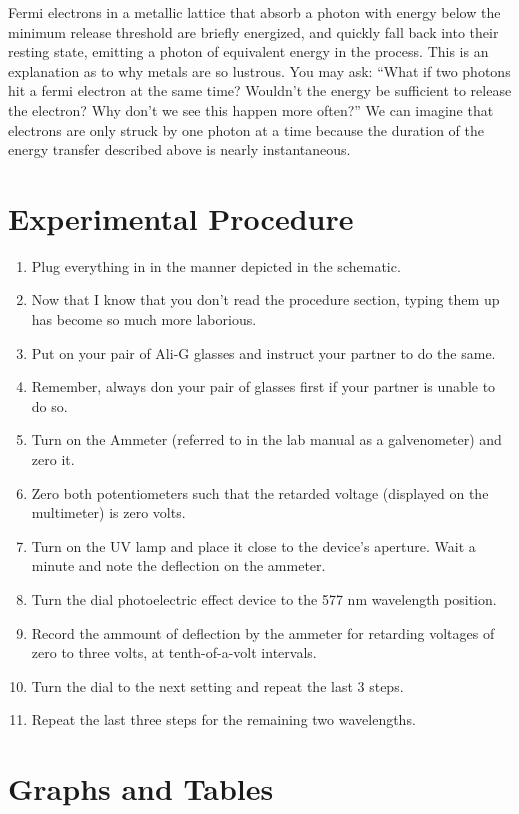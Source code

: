 \documentclass{amsart}
\begin{document}
Fermi electrons in a metallic lattice that absorb a photon with energy below the minimum release threshold are briefly energized, and quickly fall back into their resting state, emitting a photon of equivalent energy in the process. This is an explanation as to why metals are so lustrous. You may ask: “What if two photons hit a fermi electron at the same time? Wouldn’t the energy be sufficient to release the electron? Why don’t we see this happen more often?” We can imagine that electrons are only struck by one photon at a time because the duration of the energy transfer described above is nearly instantaneous.

\section{Experimental Procedure}
\begin{enumerate}
    \item Plug everything in in the manner depicted in the schematic.
    \item Now that I know that you don't read the procedure section, typing them up has become so much more laborious.
    \item Put on your pair of Ali-G glasses and instruct your partner to do the same.
    \item Remember, always don your pair of glasses first if your partner is unable to do so.
    \item Turn on the Ammeter (referred to in the lab manual as a galvenometer) and zero it.
    \item Zero both potentiometers such that the retarded voltage (displayed on the multimeter) is zero volts.
    \item Turn on the UV lamp and place it close to the device's aperture. Wait a minute and note the deflection on the ammeter.
    \item Turn the dial photoelectric effect device to the 577 nm wavelength position.
    \item Record the ammount of deflection by the ammeter for retarding voltages of zero to three volts, at tenth-of-a-volt intervals.
    \item Turn the dial to the next setting and repeat the last 3 steps.
    \item Repeat the last three steps for the remaining two wavelengths.
\end{enumerate}

\section{Graphs and Tables}
\end{document}
